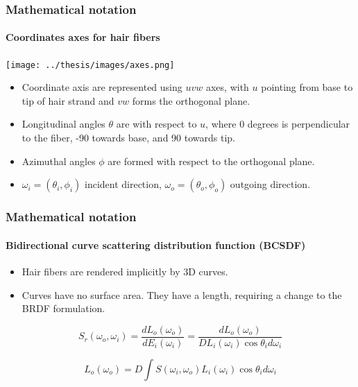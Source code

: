 \documentclass{beamer}
\begin{document}
  
  \begin{frame}
    \frametitle{Mathematical notation}
	\framesubtitle{Coordinates axes for hair fibers}

\texttt{[image: ../thesis/images/axes.png]}

\begin{itemize}
\item Coordinate axis are represented using $uvw$ axes, with $u$ pointing from base to tip of hair strand and $vw$ forms the orthogonal plane.
	
\item Longitudinal angles $\theta$ are with respect to $u$, where 0 degrees is perpendicular to the fiber, -90 towards base, and 90 towards tip.
	
\item Azimuthal angles $\phi$ are formed with respect to the orthogonal plane.
	
	\item $\omega_i = (\theta_i, \phi_i)$ incident direction, $\omega_o = (\theta_o, \phi_o)$ outgoing direction.
\end{itemize}	
	
	\end{frame}
  
\begin{frame}
    \frametitle{Mathematical notation}
	\framesubtitle{Bidirectional curve scattering distribution function (BCSDF)}
	
	\begin{itemize}
	\item Hair fibers are rendered implicitly by 3D curves.
	\item Curves have no surface area. They have a length, requiring a change to the BRDF formulation.
	\end{itemize}
	
	\begin{equation}
	S_r(\omega_o, \omega_i) = \frac{dL_o(\omega_o)}{dE_i(\omega_i)} = \frac{dL_o(\omega_o)}{DL_i(\omega_i) \cos \theta_i d\omega_i}
	\end{equation}
	
	\begin{equation}
	L_o(\omega_o) = D \int S(\omega_i, \omega_o) L_i(\omega_i) \cos \theta_i d\omega_i
	\end{equation}

  \end{frame}  
  
  
  
\end{document}
